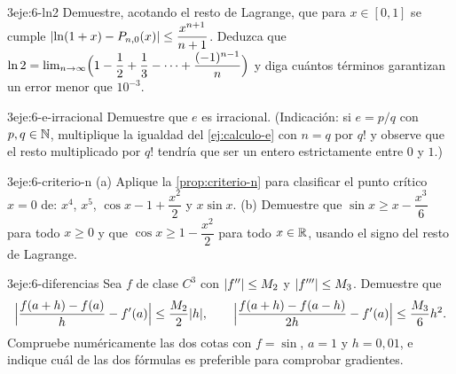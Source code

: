\begin{ejercicio}{3}{eje:6-ln2}
Demuestre, acotando el resto de Lagrange, que para $x\in[0,1]$ se cumple $\lvert\ln(1+x)-P_{n,0}(x)\rvert\le\dfrac{x^{n+1}}{n+1}$. Deduzca que $\ln2=\lim_{n\to\infty}\Bigl(1-\dfrac12+\dfrac13-\dots+\dfrac{(-1)^{n-1}}{n}\Bigr)$ y diga cuántos términos garantizan un error menor que $10^{-3}$.
\end{ejercicio}

\begin{ejercicio}{3}{eje:6-e-irracional}
Demuestre que $e$ es irracional. (Indicación: si $e=p/q$ con $p,q\in\mathbb{N}$, multiplique la igualdad del \cref{ej:calculo-e} con $n=q$ por $q!$ y observe que el resto multiplicado por $q!$ tendría que ser un entero estrictamente entre $0$ y $1$.)
\end{ejercicio}

\begin{ejercicio}{3}{eje:6-criterio-n}
(a) Aplique la \cref{prop:criterio-n} para clasificar el punto crítico $x=0$ de: $x^{4}$, $x^{5}$, $\cos x-1+\dfrac{x^{2}}{2}$ y $x\sin x$. (b) Demuestre que $\sin x\ge x-\dfrac{x^{3}}{6}$ para todo $x\ge0$ y que $\cos x\ge1-\dfrac{x^{2}}{2}$ para todo $x\in\mathbb{R}$, usando el signo del resto de Lagrange.
\end{ejercicio}

\begin{ejercicio}{3}{eje:6-diferencias}
Sea $f$ de clase $C^{3}$ con $\lvert f''\rvert\le M_2$ y $\lvert f'''\rvert\le M_3$. Demuestre que
\[
\Bigl|\frac{f(a+h)-f(a)}{h}-f'(a)\Bigr|\le\frac{M_2}{2}\lvert h\rvert,\qquad
\Bigl|\frac{f(a+h)-f(a-h)}{2h}-f'(a)\Bigr|\le\frac{M_3}{6}h^{2}.
\]
Compruebe numéricamente las dos cotas con $f=\sin$, $a=1$ y $h=0{,}01$, e indique cuál de las dos fórmulas es preferible para comprobar gradientes.
\end{ejercicio}
